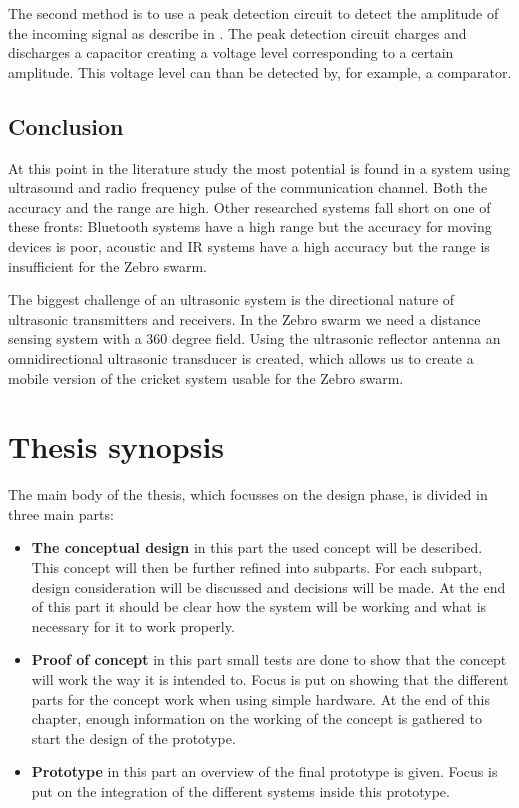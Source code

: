 The second method is to use a peak detection circuit to detect the amplitude of the incoming signal as describe in \cite{Bhagat2015}.
The peak detection circuit charges and discharges a capacitor creating a voltage level corresponding to a certain amplitude.
This voltage level can than be detected by, for example, a comparator.

\subsection*{Conclusion}

At this point in the literature study the most potential is found in a system using ultrasound and radio frequency pulse of the communication channel. Both the accuracy and the range are high. Other researched systems fall short on one of these fronts: Bluetooth systems have a high range but the accuracy for moving devices is poor, acoustic and IR systems have a high accuracy but the range is insufficient for the Zebro swarm.

The biggest challenge of an ultrasonic system is the directional nature of ultrasonic transmitters and receivers. In the Zebro swarm we need a distance sensing system with a 360 degree field. Using the ultrasonic reflector antenna \cite{Claycomb1992} an omnidirectional ultrasonic transducer is created, which allows us to create a mobile version of the cricket system \cite{Priyantha2000,Priyantha2005,Balakrishnan2003,Smith2005} usable for the Zebro swarm.


\section{Thesis synopsis}

The main body of the thesis, which focusses on the design phase, is divided in three main parts:

\begin{itemize}
  \item
  \textbf{The conceptual design} in this part the used concept will be described.
  This concept will then be further refined into subparts.
  For each subpart, design consideration will be discussed and decisions will be made.
  At the end of this part it should be clear how the system will be working and what is necessary for it to work properly.
  \item
  \textbf{Proof of concept} in this part small tests are done to show that the concept will work the way it is intended to.
  Focus is put on showing that the different parts for the concept work when using simple hardware.
  At the end of this chapter, enough information on the working of the concept is gathered to start the design of the prototype.
  \item
  \textbf{Prototype} in this part an overview of the final prototype is given.
  Focus is put on the integration of the different systems inside this prototype.
  \end{itemize}

